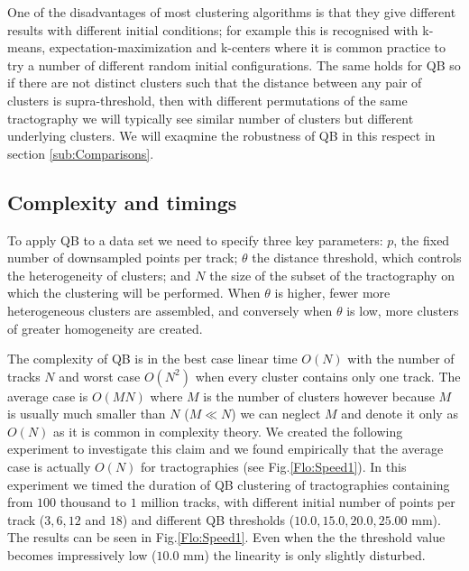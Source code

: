 \documentclass[preprint,authoryear,a4paper,10pt,onecolumn]{elsarticle}
\begin{document}
One of the disadvantages of most clustering algorithms is that they give
different results with different initial conditions; for example this is
recognised with k-means, expectation-maximization
\citep{dempster1977maximum} and k-centers \citep{gonzalez1985clustering}
where it is common practice to try a number of different random initial
configurations. The same holds for QB so if there are not distinct
clusters such that the distance between any pair of clusters is
supra-threshold, then with different permutations of the same
tractography we will typically see similar number of clusters but
different underlying clusters. We will exaqmine the robustness of QB in
this respect in section \ref{sub:Comparisons}.

\subsection{Complexity and timings\label{sub:Complexity}}

To apply QB to a data set we need to specify three key parameters:
$p$, the fixed number of downsampled points per track; $\theta$
the distance threshold, which controls the heterogeneity of clusters;
and $N$ the size of the subset of the tractography on which the clustering
will be performed. When $\theta$ is higher, fewer more heterogeneous
clusters are assembled, and conversely when $\theta$ is low, more
clusters of greater homogeneity are created.

The complexity of QB is in the best case linear time $O(N)$ with
the number of tracks $N$ and worst case $O(N^{2})$ when every cluster
contains only one track. The average case is $O(MN)$ where $M$ is
the number of clusters however because $M$ is usually much smaller
than $N$ ($M\ll N$) we can neglect $M$ and denote it only as $O(N)$
as it is common in complexity theory. We created the following experiment
to investigate this claim and we found empirically that the average
case is actually $O(N)$ for tractographies (see Fig.\ref{Flo:Speed1}).
In this experiment we timed the duration of QB clustering of tractographies
containing from $100$ thousand to $1$ million tracks, with different
initial number of points per track ($3,6,12$ and $18$) and different
QB thresholds ($10.0,15.0,20.0,25.00$ mm). The results can be seen
in Fig.\ref{Flo:Speed1}. Even when the the threshold value becomes impressively
low ($10.0$ mm) the linearity is only slightly disturbed.

\end{document}
